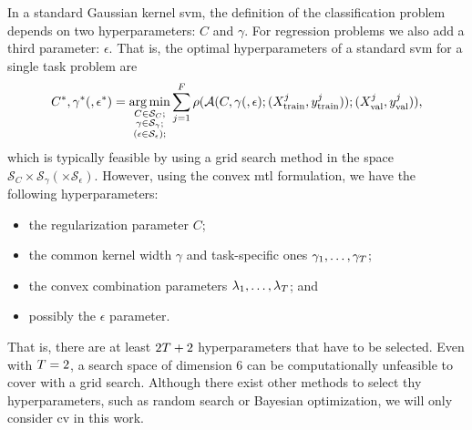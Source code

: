 %
In a standard Gaussian kernel \acrshort{svm}, the definition of the classification problem depends on two hyperparameters: $C$ and $\gamma$.
For regression problems we also add a third parameter: $\epsilon$. 
That is, the optimal hyperparameters of a standard \acrshort{svm} for a single task problem are
\begin{equation}
    \nonumber
    C^*, \gamma^* (, \epsilon^*) = \operatorname*{arg\min}_{\substack{C \in \mathcal{S}_C ; \\ \substack{\gamma \in \mathcal{S}_\gamma} ; \\ \left(\substack{\epsilon \in \mathcal{S}_\epsilon} \right); }}
     \sum_{j=1}^{F} \rho(\mathcal{A}(C, \gamma (, \epsilon); (X^j_\text{train}, y^j_\text{train})); (X^j_\text{val}, y^j_\text{val})) ,
\end{equation}
which is typically feasible by using a grid search method in the space $\mathcal{S}_{C} \times \mathcal{S}_{\gamma} (\times \mathcal{S}_{\epsilon}) .$
%
However, using the convex \acrshort{mtl} formulation, 
we have the following hyperparameters: 
\begin{itemize}
    \item the regularization parameter $C$;
    \item the common kernel width $\gamma$ and task-specific ones $\gamma_1, \ldots, \gamma_T$;
    \item the convex combination parameters $\lambda_1, \ldots, \lambda_T$; and
    \item possibly the $\epsilon$ parameter.
\end{itemize}
That is, there are at least $2T + 2$ hyperparameters that have to be selected. Even with $T=2$, a search space of dimension $6$ can be computationally unfeasible to cover with a grid search. Although there exist other methods to select thy hyperparameters, such as random search or Bayesian optimization, we will only consider \acrshort{cv} in this work.


